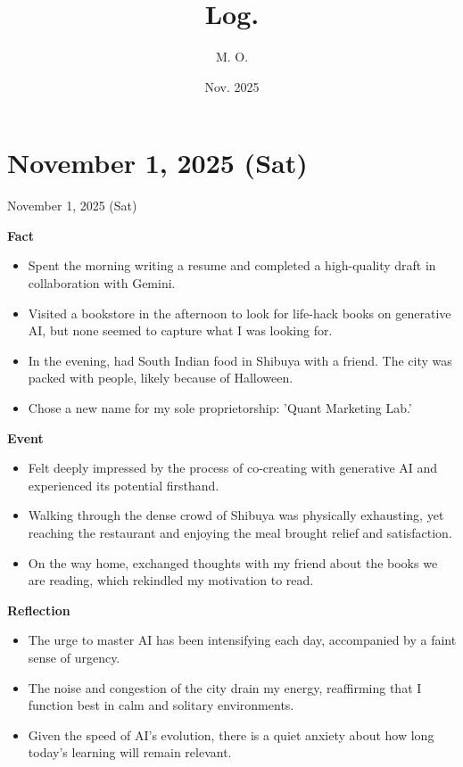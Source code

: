 \documentclass[dvipdfmx, autodetect-engine, aspectratio=169, 10.5pt]{beamer}
\title{
Log.
}
\author{
M. O.
}
\date{Nov. 2025}
\begin{document}
\maketitle

\section{November 1, 2025 (Sat)}  
\begin{frame}{November 1, 2025 (Sat)}  
	\tiny  

	\textbf{Fact}  
	\begin{itemize}
		\item Spent the morning writing a resume and completed a high-quality draft in collaboration with Gemini.  
		\item Visited a bookstore in the afternoon to look for life-hack books on generative AI, but none seemed to capture what I was looking for.  
		\item In the evening, had South Indian food in Shibuya with a friend. The city was packed with people, likely because of Halloween.  
		\item Chose a new name for my sole proprietorship: 'Quant Marketing Lab.'  
	\end{itemize}

	\textbf{Event}  
	\begin{itemize}
		\item Felt deeply impressed by the process of co-creating with generative AI and experienced its potential firsthand.  
		\item Walking through the dense crowd of Shibuya was physically exhausting, yet reaching the restaurant and enjoying the meal brought relief and satisfaction.  
		\item On the way home, exchanged thoughts with my friend about the books we are reading, which rekindled my motivation to read.  
	\end{itemize}

	\textbf{Reflection}  
	\begin{itemize}
		\item The urge to master AI has been intensifying each day, accompanied by a faint sense of urgency.  
		\item The noise and congestion of the city drain my energy, reaffirming that I function best in calm and solitary environments.  
		\item Given the speed of AI’s evolution, there is a quiet anxiety about how long today’s learning will remain relevant.  
	\end{itemize}


\end{frame}
\end{document}
